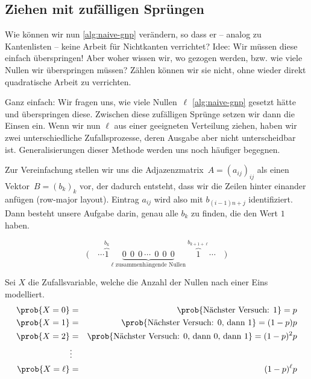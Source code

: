 \subsection{Ziehen mit zufälligen Sprüngen}\label{subsec:gnp_zufaellige_spruenge}
Wie können wir nun \cref{alg:naive-gnp} verändern, so dass er -- analog zu Kantenlisten -- keine Arbeit für Nichtkanten verrichtet?
Idee: Wir müssen diese einfach überspringen!
Aber woher wissen wir, wo  gezogen werden, bzw. wie viele Nullen wir überspringen müssen?
Zählen können wir sie nicht, ohne wieder direkt quadratische Arbeit zu verrichten.

Ganz  einfach: Wir fragen uns, wie viele Nullen~$\ell$ \cref{alg:naive-gnp} gesetzt hätte und überspringen diese.
Zwischen diese zufälligen Sprünge setzen wir dann die Einsen ein.
Wenn wir nun $\ell$ aus einer geeigneten Verteilung ziehen, haben wir zwei unterschiedliche Zufallsprozesse, deren Ausgabe aber nicht unterscheidbar ist.
Generalisierungen dieser Methode werden uns noch häufiger begegnen.

Zur  Vereinfachung stellen wir uns die Adjazenzmatrix~$A = (a_{ij})_{ij}$ als einen Vektor~$B = (b_k)_k$ vor, der dadurch entsteht, dass wir die Zeilen hinter einander anfügen (row-major layout).
Eintrag $a_{ij}$ wird also mit $b_{(i-1)n + j}$ identifiziert.
Dann besteht unsere Aufgabe darin, genau alle $b_k$ zu finden, die den Wert $1$ haben.

\begin{equation}
    \Big(\quad \cdots \overbrace{1}^{b_k} \ \underbrace{0 \ \ 0\ \ 0 \ \cdots\ \ 0\ \ 0\ \ 0}_{\text{$\ell$ zusammenhängende Nullen}}\  \overbrace{1}^{b_{k + 1+ \ell}} \cdots \quad \Big)
\end{equation}

\noindent
Sei $X$ die  Zufallsvariable, welche die Anzahl der Nullen nach einer Eins modelliert.
\begin{eqnarray}
    \prob{X = 0} &=& \prob{\textnormal{Nächster Versuch: 1}} = p \\
    \prob{X = 1} &=& \prob{\textnormal{Nächster Versuch: 0, dann 1}} = (1 - p)p \\
    \prob{X = 2} &=& \prob{\textnormal{Nächster Versuch: 0, dann 0, dann 1}} = (1 - p)^2 p \\
    &\vdots& \\
    \prob{X = \ell} &=& (1 - p)^\ell p
\end{eqnarray}

